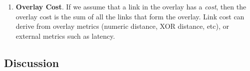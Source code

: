 \begin{enumerate}
    \item \textbf{Overlay Cost}. If we assume that a link in the overlay has a \textit{cost}, then the overlay cost is the sum of all the links that form the overlay. Link cost can derive from overlay metrics (numeric distance, XOR distance, etc), or external metrics such as latency.
    
\end{enumerate}

\subsection{Discussion}

